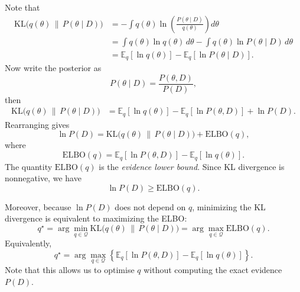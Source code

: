 \documentclass[11pt, titlepage]{article} %
\numberwithin{equation}{section}
\theoremstyle{definition}
\numberwithin{assumption}{section}
\begin{document}
Note that
\begin{align*}
    \mathrm{KL}\!\bigl(q(\theta)\,\|\,P(\theta\mid D)\bigr)
    &=
    -\int q(\theta)\ln\!\left(\frac{P(\theta\mid D)}{q(\theta)}\right)d\theta\\
    &=
    \int q(\theta)\ln q(\theta)\,d\theta
    -
    \int q(\theta)\ln P(\theta\mid D)\,d\theta\\
    &=
    \mathbb{E}_q[\ln q(\theta)]
    -
    \mathbb{E}_q[\ln P(\theta\mid D)].
\end{align*}
Now write the posterior as
\begin{equation*}
    P(\theta\mid D)=\frac{P(\theta,D)}{P(D)},
\end{equation*}
then
\begin{align*}
    \mathrm{KL}\!\bigl(q(\theta)\,\|\,P(\theta\mid D)\bigr)
    &=
    \mathbb{E}_q[\ln q(\theta)]
    -
    \mathbb{E}_q[\ln P(\theta,D)]
    +
    \ln P(D).
\end{align*}
Rearranging gives
\begin{equation*}
    \ln P(D)
    =
    \mathrm{KL}\!\bigl(q(\theta)\,\|\,P(\theta\mid D)\bigr)
    +
    \mathrm{ELBO}(q),
\end{equation*}
where
\begin{equation*}
    \mathrm{ELBO}(q)
    =
    \mathbb{E}_q[\ln P(\theta,D)]
    -
    \mathbb{E}_q[\ln q(\theta)].
\end{equation*}
The quantity $\mathrm{ELBO}(q)$ is the \textit{evidence lower bound}. Since KL divergence is nonnegative, we have
\begin{equation*}
    \ln P(D)\ge \mathrm{ELBO}(q).
\end{equation*}


Moreover, because $\ln P(D)$ does not depend on $q$, minimizing the KL divergence is equivalent to maximizing the ELBO:
\begin{equation*}
    q^\star
    =
    \arg\min_{q\in\mathcal{Q}}
    \mathrm{KL}\!\bigl(q(\theta)\,\|\,P(\theta\mid D)\bigr)
    =
    \arg\max_{q\in\mathcal{Q}} \mathrm{ELBO}(q).
\end{equation*}
Equivalently,
\begin{equation*}
    q^\star
    =
    \arg\max_{q\in\mathcal{Q}}
    \left\{
    \mathbb{E}_q[\ln P(\theta,D)]
    -
    \mathbb{E}_q[\ln q(\theta)]
    \right\}.
\end{equation*}
Note that this allows us to optimise $q$ without computing the exact evidence $P(D)$.
\end{document}

